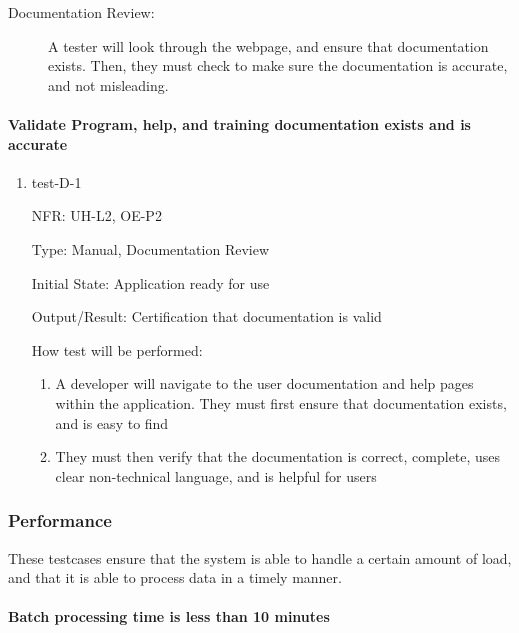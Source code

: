 \documentclass[12pt, titlepage]{article}
\begin{document}
\begin{description}
  \item[Documentation Review:] A tester will look through the webpage, and
  ensure that documentation exists. Then, they must check to make sure the
  documentation is accurate, and not misleading. 
\end{description}

\paragraph{Validate Program, help, and training documentation exists and is accurate}
\begin{enumerate}
  \item{test-D-1}
  
  NFR: UH-L2, OE-P2

  Type: Manual, Documentation Review

  Initial State: Application ready for use

  Output/Result: Certification that documentation is valid

  How test will be performed:
  \begin{enumerate}
    \item A developer will navigate to the user documentation and help pages within the application. They must first ensure that documentation exists, and is easy to find
    \item They must then verify that the documentation is correct, complete, uses clear non-technical language, and is helpful for users
  \end{enumerate}
\end{enumerate}


\subsubsection{Performance}
These testcases ensure that the system is able to handle a certain amount of load, and that it is able to process data in a timely manner.

\paragraph{Batch processing time is less than 10 minutes}
\end{document}
